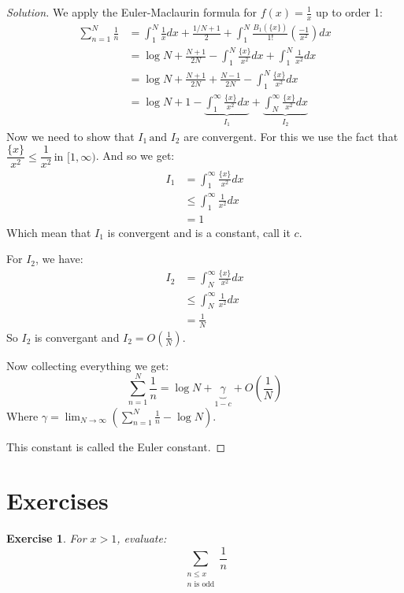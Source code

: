 \documentclass{article}
\newtheorem{ex}{Exercise}
\newenvironment{sol}
  {\renewcommand{\qedsymbol}{}\begin{proof}[Solution]}
  {\end{proof}}
\begin{document}
\begin{sol}
We apply the Euler-Maclaurin formula for $f(x) = \frac{1}{x}$ up to order 1:
\begin{align*}
	\sum_{n=1}^{N} \frac{1}{n}
	&= \int_{1}^{N} \frac{1}{x} dx + \frac{1/N + 1}{2} + \int_{1}^{N} \frac{B_1(\{x\})}{1!} \left(\frac{-1}{x^2}\right) dx \\
	&= \log N + \frac{N+1}{2N} - \int_{1}^{N} \frac{\{x\}}{x^2} dx + \int_{1}^{N} \frac{1}{x^2} dx \\
	&= \log N + \frac{N+1}{2N} + \frac{N-1}{2N} - \int_{1}^{N} \frac{\{x\}}{x^2} dx \\
	&= \log N + 1 - \underbrace{\int_{1}^{\infty} \frac{\{x\}}{x^2} dx}_{I_1} + \underbrace{\int_{N}^{\infty} \frac{\{x\}}{x^2} dx}_{I_2}
\end{align*}
Now we need to show that $I_1 \, \text{and } I_2$ are convergent. For this we use the fact that $\dfrac{\{x\}}{x^2} \le \dfrac{1}{x^2}\, \text{in } [1, \infty)$. And so we get:
\begin{align*}
	I_1 &= \int_{1}^{\infty} \frac{\{x\}}{x^2} dx \\
	  &\le \int_{1}^{\infty} \frac{1}{x^2} dx \\
	  &= 1
\end{align*}
Which mean that $I_1$ is convergent and is a constant, call it $c$.


For $I_2$, we have:
\begin{align*}
	I_2 &= \int_{N}^{\infty} \frac{\{x\}}{x^2} dx \\
	    &\le \int_{N}^{\infty} \frac{1}{x^2} dx \\
	    &= \frac{1}{N}
\end{align*}
So $I_2$ is convergant and $I_2 = O(\frac{1}{N})$.

Now collecting everything we get:
$$
\sum_{n=1}^{N} \frac{1}{n} = \log N + \underbrace{\gamma}_{1 - c} + O\left(\frac{1}{N}\right)
$$
Where $\gamma = \lim_{N \to \infty} \left( \sum_{n=1}^{N} \frac{1}{n} - \log N \right)$.

This constant is called the Euler constant.
\end{sol}

\medskip

\section{Exercises}

\begin{ex}
For $x > 1$, evaluate:
$$
    \sum_{\substack{n \le x \\ n \text{ is odd}}} \frac{1}{n}
$$
\end{ex}
\end{document}
